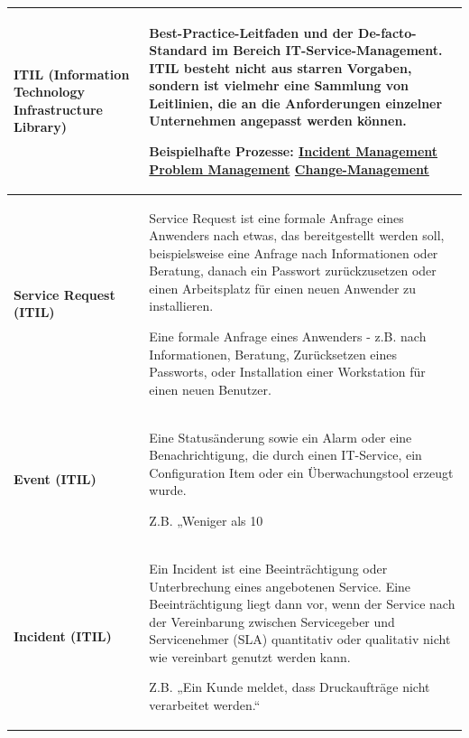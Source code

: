 \documentclass[10pt]{article}
\begin{document}
\begin{flushleft}
\begin{longtable}{|p{}|p{}|}
        \textbf{ITIL (Information Technology Infrastructure Library)}&
        Best-Practice-Leitfaden und der De-facto-Standard im Bereich IT-Service-Management. ITIL besteht nicht aus starren Vorgaben, sondern ist vielmehr eine \textbf{Sammlung von Leitlinien}, die an die Anforderungen einzelner Unternehmen angepasst werden können.
        
        Beispielhafte Prozesse: \newline
        \href{https://wiki.de.it-processmaps.com/index.php/Incident_Management}{Incident Management} \newline
        \href{https://wiki.de.it-processmaps.com/index.php/Problem_Management}{Problem Management} \newline
        \href{https://wiki.de.it-processmaps.com/index.php/Change_Management}{Change-Management} 
        \\\hline

        \textbf{Service Request (ITIL)}&
        Service Request ist eine formale Anfrage eines Anwenders nach etwas, das bereitgestellt werden soll, beispielsweise eine Anfrage nach Informationen oder Beratung, danach ein Passwort zurückzusetzen oder einen Arbeitsplatz für einen neuen Anwender zu installieren.
        \begin{outline}
            \1 Eine formale Anfrage eines Anwenders - z.B. nach Informationen, Beratung, Zurücksetzen eines Passworts, oder Installation einer Workstation für einen neuen Benutzer.
        \end{outline}
        \\\hline

        \textbf{Event (ITIL)}&
        Eine Statusänderung sowie ein Alarm oder eine Benachrichtigung, die durch einen IT-Service, ein Configuration Item oder ein Überwachungstool erzeugt wurde.
        
        Z.B. „Weniger als 10%
        \\\hline

        \textbf{Incident (ITIL)}&
        Ein Incident ist eine Beeinträchtigung oder Unterbrechung eines angebotenen Service. Eine Beeinträchtigung liegt dann vor, wenn der Service nach der Vereinbarung zwischen Servicegeber und Servicenehmer (SLA) quantitativ oder qualitativ nicht wie vereinbart genutzt werden kann.

        Z.B. „Ein Kunde meldet, dass Druckaufträge nicht verarbeitet werden.“
        \\\hline


\end{longtable}
\end{flushleft}
\end{document}

